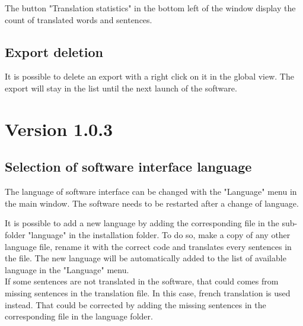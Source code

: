The button "Translation statistics" in the bottom left of the window display the count of translated words and sentences.\

\subsection{Export deletion}
It is possible to delete an export with a right click on it in the global view. The export will stay in the list until the next launch of the software.\\

\section{Version 1.0.3}



\subsection{Selection of software interface language}
The language of software interface can be changed with the "Language" menu in the main window. The software needs to be restarted after a change of language.

It is possible to add a new language by adding the corresponding file in the sub-folder "language" in the installation \tria folder. To do so, make a copy of any other language file, rename it with the correct code and translates every sentences in the file. The new language will be automatically added to the list of available language in the "Language" menu.\\

If some sentences are not translated in the software, that could comes from missing sentences in the translation file. In this case, french translation is used instead. That could be corrected by adding the missing sentences in the corresponding file in the language folder.\\


